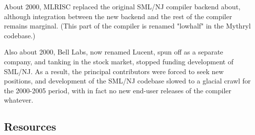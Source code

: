 About 2000, MLRISC replaced the original SML/NJ compiler 
backend about, although integration between the new 
backend and the rest of the compiler remains marginal. 
(This part of the compiler is renamed "lowhalf" in the Mythryl 
codebase.)

Also about 2000, Bell Labs, now renamed Lucent, spun off 
as a separate company, and tanking in the stock market, 
stopped funding development of SML/NJ.  As a result, the 
principal contributors were forced to seek new positions, 
and development of the SML/NJ codebase slowed to a glacial 
crawl for the 2000-2005 period, with in fact no new end-user 
releases of the compiler whatever.


\cutend*


\subsection{Resources}
\label{section:compiler:resources}

